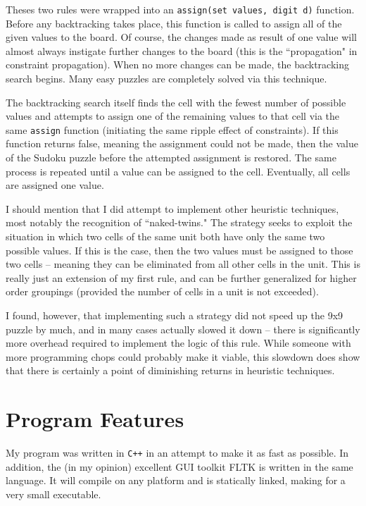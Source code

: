\documentclass{article}
\begin{document}
Theses two rules were wrapped into an \texttt{assign(set values, digit d)} function. Before any backtracking takes place, this function is called to assign all of the given values to the board. Of course, the changes made as result of one value will almost always instigate further changes to the board (this is the ``propagation" in constraint propagation). When no more changes can be made, the backtracking search begins. Many easy puzzles are completely solved via this technique.

The backtracking search itself finds the cell with the fewest number of possible values and attempts to assign one of the remaining values to that cell via the same \texttt{assign} function (initiating the same ripple effect of constraints). If this function returns false, meaning the assignment could not be made, then the value of the Sudoku puzzle before the attempted assignment is restored. The same process is repeated until a value can be assigned to the cell. Eventually, all cells are assigned one value.

I should mention that I did attempt to implement other heuristic techniques, most notably the recognition of ``naked-twins." The strategy seeks to exploit the situation in which two cells of the same unit both have only the same two possible values. If this is the case, then the two values must be assigned to those two cells -- meaning they can be eliminated from all other cells in the unit. This is really just an extension of my first rule, and can be further generalized for higher order groupings (provided the number of cells in a unit is not exceeded).

I found, however, that implementing such a strategy did not speed up the 9x9 puzzle by much, and in many cases actually slowed it down -- there is significantly more overhead required to implement the logic of this rule. While someone with more programming chops could probably make it viable, this slowdown does show that there is certainly a point of diminishing returns in heuristic techniques.

\section*{Program Features}

My program was written in \texttt{C++} in an attempt to make it as fast as possible. In addition, the (in my opinion) excellent GUI toolkit FLTK is written in the same language. It will compile on any platform and is statically linked, making for a very small executable.
\end{document}
